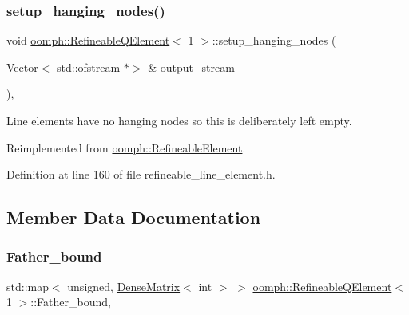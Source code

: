 \subsubsection{\texorpdfstring{setup\+\_\+hanging\+\_\+nodes()}{setup\_hanging\_nodes()}}
{\footnotesize\ttfamily void \hyperlink{classoomph_1_1RefineableQElement}{oomph\+::\+Refineable\+Q\+Element}$<$ 1 $>$\+::setup\+\_\+hanging\+\_\+nodes (\begin{DoxyParamCaption}\item[{\hyperlink{classoomph_1_1Vector}{Vector}$<$ std\+::ofstream $\ast$$>$ \&}]{output\+\_\+stream }\end{DoxyParamCaption})\hspace{0.3cm}{\ttfamily [inline]}, {\ttfamily [virtual]}}



Line elements have no hanging nodes so this is deliberately left empty. 



Reimplemented from \hyperlink{classoomph_1_1RefineableElement_a9368e9ffa7d06a436253d0e23f874d65}{oomph\+::\+Refineable\+Element}.



Definition at line 160 of file refineable\+\_\+line\+\_\+element.\+h.



\subsection{Member Data Documentation}
\mbox{\label{classoomph_1_1RefineableQElement_3_011_01_4_a48915986c094b8e6bbf3c92b8528eb1b}} 
\subsubsection{\texorpdfstring{Father\+\_\+bound}{Father\_bound}}
{\footnotesize\ttfamily std\+::map$<$ unsigned, \hyperlink{classoomph_1_1DenseMatrix}{Dense\+Matrix}$<$ int $>$ $>$ \hyperlink{classoomph_1_1RefineableQElement}{oomph\+::\+Refineable\+Q\+Element}$<$ 1 $>$\+::Father\+\_\+bound\hspace{0.3cm}{\ttfamily [static]}, {\ttfamily [protected]}}



